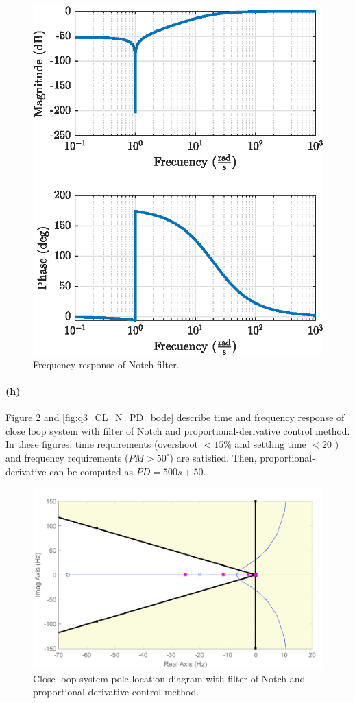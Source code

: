 \begin{figure}[h!]
	\centering
	\includegraphics{images/question3/q3_bode_N.eps}
	\caption{Frequency response of Notch filter.}
	\label{fig:notch_filter}
\end{figure}

\newpage
\paragraph{(h)} Figure \ref{fig:q3_CL_N_PD_rlocus} and \ref{fig:q3_CL_N_PD_bode} describe time and frequency response of close loop system with filter of Notch and proportional-derivative control method. In these figures, time requirements (overshoot $<15\%$ and settling time $<20$ ) and frequency requirements ($PM>50^{\circ}$) are satisfied. Then, proportional-derivative can be computed as $PD =500 s + 50$. 


\begin{figure}[h!]
	\centering
	\includegraphics[width=.7\textwidth]{images/question3/sisotool_rlocus.pdf}
	\caption{Close-loop system pole location diagram with filter of Notch and proportional-derivative control method.}
	\label{fig:q3_CL_N_PD_rlocus}
\end{figure}


